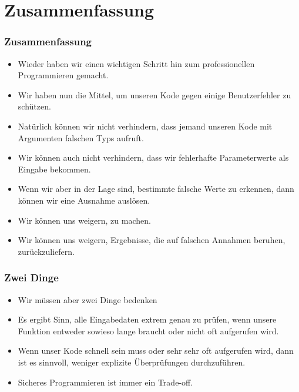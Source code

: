 \documentclass[aspectratio=169,mathserif,notheorems]{beamer}%
\begin{document}
\section{Zusammenfassung}%
%
\begin{frame}%
\frametitle{Zusammenfassung}%
\begin{itemize}%
%
\item Wieder haben wir einen wichtigen Schritt hin zum professionellen Programmieren gemacht.%
%
\item<2-> Wir haben nun die Mittel, um unseren Kode gegen einige Benutzerfehler zu schützen.%
%
\item<3-> Natürlich können wir nicht verhindern, dass jemand unseren Kode mit Argumenten falschen Typs aufruft.%
%
\item<4-> Wir können auch nicht verhindern, dass wir fehlerhafte Parameterwerte als Eingabe bekommen.%
%
\item<5-> Wenn wir aber in der Lage sind, bestimmte falsche Werte zu erkennen, dann können wir eine Ausnahme auslösen.%
%
\item<6-> Wir können uns weigern,  zu machen.%
%
\item<7-> Wir können uns weigern, Ergebnisse, die auf falschen Annahmen beruhen, zurückzuliefern.%
%
\end{itemize}%
\end{frame}%
%
\begin{frame}%
\frametitle{Zwei Dinge}%
\begin{itemize}%
\item Wir müssen aber zwei Dinge bedenken%
%
\item<4-> Es ergibt Sinn, alle Eingabedaten extrem genau zu prüfen, wenn unsere Funktion entweder sowieso lange braucht oder nicht oft aufgerufen wird.%
%
\item<5-> Wenn unser Kode schnell sein muss oder sehr sehr oft aufgerufen wird, dann ist es sinnvoll, weniger explizite Überprüfungen durchzuführen.%
%
\item<6-> Sicheres Programmieren ist immer ein Trade-off.%
\end{itemize}%
\end{frame}%
%
\endPresentation%
\end{document}
